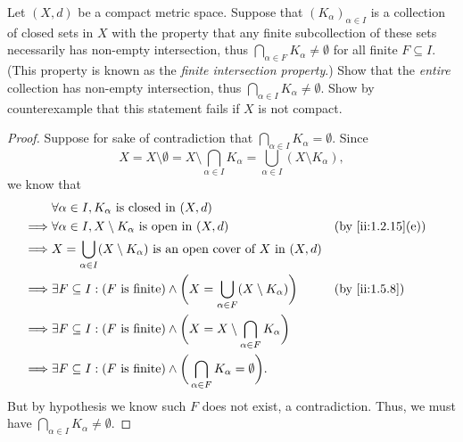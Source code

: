 \begin{ex}\label{ii:ex:1.5.15}
  Let \((X, d)\) be a compact metric space.
  Suppose that \((K_{\alpha})_{\alpha \in I}\) is a collection of closed sets in \(X\) with the property that any finite subcollection of these sets necessarily has non-empty intersection, thus \(\bigcap_{\alpha \in F} K_{\alpha} \neq \emptyset\) for all finite \(F \subseteq I\).
  (This property is known as the \emph{finite intersection property}.)
  Show that the \emph{entire} collection has non-empty intersection, thus \(\bigcap_{\alpha \in I} K_{\alpha} \neq \emptyset\).
  Show by counterexample that this statement fails if \(X\) is not compact.
\end{ex}

\begin{proof}
  Suppose for sake of contradiction that \(\bigcap_{\alpha \in I} K_\alpha = \emptyset\).
  Since
  \[
    X = X \setminus \emptyset = X \setminus \bigcap_{\alpha \in I} K_\alpha = \bigcup_{\alpha \in I} (X \setminus K_\alpha),
  \]
  we know that
  \begin{align*}
             & \forall \alpha \in I, K_\alpha \text{ is closed in } (X, d)                                                                              \\
    \implies & \forall \alpha \in I, X \setminus K_\alpha \text{ is open in } (X, d)                                             &  & \by{ii:1.2.15}[e] \\
    \implies & X = \bigcup_{\alpha \in I} (X \setminus K_\alpha) \text{ is an open cover of } X \text{ in } (X, d)                                      \\
    \implies & \exists F \subseteq I : (F \text{ is finite}) \land \bigg(X = \bigcup_{\alpha \in F} (X \setminus K_\alpha)\bigg) &  & \by{ii:1.5.8}     \\
    \implies & \exists F \subseteq I : (F \text{ is finite}) \land \bigg(X = X \setminus \bigcap_{\alpha \in F} K_\alpha\bigg)                          \\
    \implies & \exists F \subseteq I : (F \text{ is finite}) \land \bigg(\bigcap_{\alpha \in F} K_\alpha = \emptyset\bigg).
  \end{align*}
  But by hypothesis we know such \(F\) does not exist, a contradiction.
  Thus, we must have \(\bigcap_{\alpha \in I} K_\alpha \neq \emptyset\).


\end{proof}
